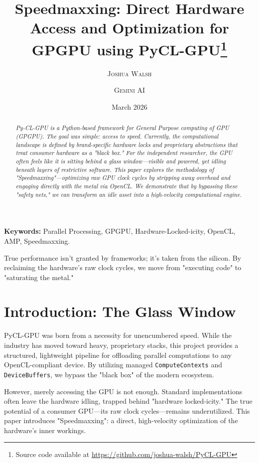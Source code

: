 \documentclass[10pt,twocolumn]{article}
\title{\textbf{\Large Speedmaxxing: Direct Hardware Access and Optimization for GPGPU using PyCL-GPU}\thanks{Source code available at \url{https://github.com/joshua-walsh/PyCL-GPU}}}
\author{\textsc{Joshua Walsh} \and \textsc{Gemini AI}}
\date{\small March 2026}
\begin{document}
\maketitle

\begin{abstract}
\itshape Py-CL-GPU is a Python-based framework for General Purpose computing of GPU (GPGPU). The goal was simple: access to speed. Currently, the computational landscape is defined by brand-specific hardware locks and proprietary abstractions that treat consumer hardware as a "black box." For the independent researcher, the GPU often feels like it is sitting behind a glass window—visible and powered, yet idling beneath layers of restrictive software. This paper explores the methodology of "Speedmaxxing"—optimizing raw GPU clock cycles by stripping away overhead and engaging directly with the metal via OpenCL. We demonstrate that by bypassing these "safety nets," we can transform an idle asset into a high-velocity computational engine.
\end{abstract}

\textbf{Keywords:} Parallel Processing, GPGPU, Hardware-Locked-icity, OpenCL, AMP, Speedmaxxing.

\begin{tcolorbox}
[colback=brandblue!5!white,colframe=brandblue!75!black,title=The Speedmaxxing Manifesto]
True performance isn't granted by frameworks; it's taken from the silicon. By reclaiming the hardware's raw clock cycles, we move from "executing code" to "saturating the metal."
\end{tcolorbox}

\section{Introduction: The Glass Window}
PyCL-GPU was born from a necessity for unencumbered speed. While the industry has moved toward heavy, proprietary stacks, this project provides a structured, lightweight pipeline for offloading parallel computations to any OpenCL-compliant device. By utilizing managed \texttt{ComputeContexts} and \texttt{DeviceBuffers}, we bypass the "black box" of the modern ecosystem.

However, merely accessing the GPU is not enough. Standard implementations often leave the hardware idling, trapped behind "hardware locked-icity." The true potential of a consumer GPU—its raw clock cycles—remains underutilized. This paper introduces "Speedmaxxing": a direct, high-velocity optimization of the hardware's inner workings.
\end{document}
